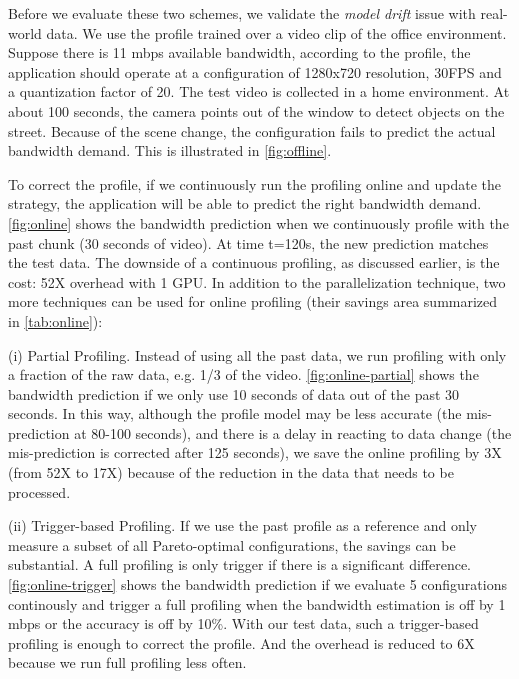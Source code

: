  Before we evaluate these two
schemes, we validate the \textit{model drift} issue with real-world data. We use
the profile trained over a video clip of the office environment. Suppose there
is 11 mbps available bandwidth, according to the profile, the application should
operate at a configuration of 1280x720 resolution, 30FPS and a quantization
factor of 20. The test video is collected in a home environment. At about 100
seconds, the camera points out of the window to detect objects on the street.
Because of the scene change, the configuration fails to predict the actual
bandwidth demand. This is illustrated in \autoref{fig:offline}.

To correct the profile, if we continuously run the profiling online and update
the strategy, the application will be able to predict the right bandwidth
demand. \autoref{fig:online} shows the bandwidth prediction when we continuously
profile with the past chunk (30 seconds of video). At time t=120s, the new
prediction matches the test data. The downside of a continuous profiling, as
discussed earlier, is the cost: 52X overhead with 1 GPU. In addition to the
parallelization technique, two more techniques can be used for online profiling
(their savings area summarized in \autoref{tab:online}):

(i) Partial Profiling. Instead of using all the past data, we run profiling with
only a fraction of the raw data, e.g. 1/3 of the video.
\autoref{fig:online-partial} shows the bandwidth prediction if we only use 10
seconds of data out of the past 30 seconds. In this way, although the profile
model may be less accurate (the mis-prediction at 80-100 seconds), and there is
a delay in reacting to data change (the mis-prediction is corrected after 125
seconds), we save the online profiling by 3X (from 52X to 17X) because of the
reduction in the data that needs to be processed.

(ii) Trigger-based Profiling. If we use the past profile as a reference and only
measure a subset of all Pareto-optimal configurations, the savings can be
substantial. A full profiling is only trigger if there is a significant
difference. \autoref{fig:online-trigger} shows the bandwidth prediction if we
evaluate 5 configurations continously and trigger a full profiling when the
bandwidth estimation is off by 1 mbps or the accuracy is off by 10\%. With our
test data, such a trigger-based profiling is enough to correct the profile.  And
the overhead is reduced to 6X because we run full profiling less often.

